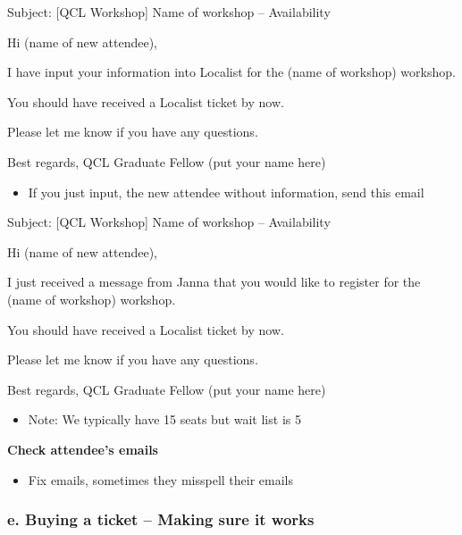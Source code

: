 \documentclass[
]{book}
\providecommand{\tightlist}{%
  \setlength{\itemsep}{0pt}\setlength{\parskip}{0pt}}
\begin{document}
Subject: {[}QCL Workshop{]} Name of workshop -- Availability

Hi (name of new attendee),

I have input your information into Localist for the (name of workshop) workshop.

You should have received a Localist ticket by now.

Please let me know if you have any questions.

Best regards,
QCL Graduate Fellow (put your name here)

\begin{itemize}
\tightlist
\item
  If you just input, the new attendee without information, send this email
\end{itemize}

Subject: {[}QCL Workshop{]} Name of workshop -- Availability

Hi (name of new attendee),

I just received a message from Janna that you would like to register for the (name of workshop) workshop.

You should have received a Localist ticket by now.

Please let me know if you have any questions.

Best regards,
QCL Graduate Fellow (put your name here)

\begin{itemize}
\tightlist
\item
  Note: We typically have 15 seats but wait list is 5
\end{itemize}

\textbf{Check attendee's emails}

\begin{itemize}
\tightlist
\item
  Fix emails, sometimes they misspell their emails
\end{itemize}

\hypertarget{e.-buying-a-ticket-making-sure-it-works}{%
\subsubsection{\texorpdfstring{e. Buying a ticket -- Making sure it works }{e. Buying a ticket -- Making sure it works }}\label{e.-buying-a-ticket-making-sure-it-works}}
\end{document}
